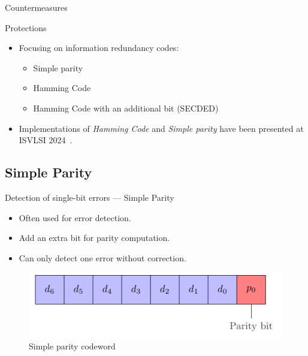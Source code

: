 \begin{frame}{Countermeasures}
    \begin{block}{Protections}
        \begin{itemize}
            \item Focusing on information redundancy codes:
            \begin{itemize}
                \item Simple parity
                \item Hamming Code
                \item Hamming Code with an additional bit (SECDED)
            \end{itemize}
            \item Implementations of \textit{Hamming Code} and \textit{Simple parity} have been presented at ISVLSI 2024~\cite{PRLG-24-isvlsi}.
        \end{itemize}
    \end{block}
\end{frame}
\subsection{Simple Parity}
    \begin{frame}{Detection of single-bit errors — Simple Parity}
        \begin{block}{}
            \begin{itemize}
                \justifying
                \item Often used for error detection.
                \item Add an extra bit for parity computation.
                \item Can only detect one error without correction.
            \end{itemize}
        \end{block}

        \vfill
        
        \begin{figure}
            \centering
            \includegraphics[width=.5\textwidth, page=1]{src/4_strategies/img/simple_parity.pdf}
            \caption{Simple parity codeword}
            \label{fig:simple_parity_codeword}
        \end{figure}
    \end{frame}
